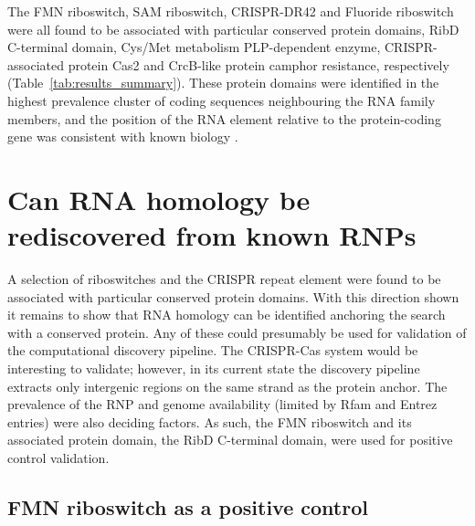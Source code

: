 The \ac{FMN} riboswitch, \ac{SAM} riboswitch, \ac{CRISPR}-DR42 and Fluoride riboswitch were all found to be associated with particular conserved protein domains, RibD C-terminal domain, Cys/Met metabolism PLP-dependent enzyme, CRISPR-associated protein Cas2 and CrcB-like protein camphor resistance, respectively (Table~\ref{tab:results_summary}).
These protein domains were identified in the highest prevalence cluster of coding sequences neighbouring the RNA family members, and the position of the RNA element relative to the protein-coding gene was consistent with known biology \citep{Tang2020,Baker2012,Mironov2002,Barrangou2007}.

\section{Can RNA homology be rediscovered from known \ac{RNP}s}

A selection of riboswitches and the \ac{CRISPR} repeat element were found to be associated with particular conserved protein domains.
With this direction shown it remains to show that RNA homology can be identified anchoring the search with a conserved protein.
Any of these could presumably be used for validation of the computational discovery pipeline.
The \ac{CRISPR}-Cas system would be interesting to validate; however, in its current state the discovery pipeline extracts only intergenic regions on the same strand as the protein anchor.
The prevalence of the \ac{RNP} and genome availability (limited by Rfam and Entrez entries) were also deciding factors.
As such, the \ac{FMN} riboswitch and its associated protein domain, the RibD C-terminal domain, were used for positive control validation.

\subsection{\ac{FMN} riboswitch as a positive control}

